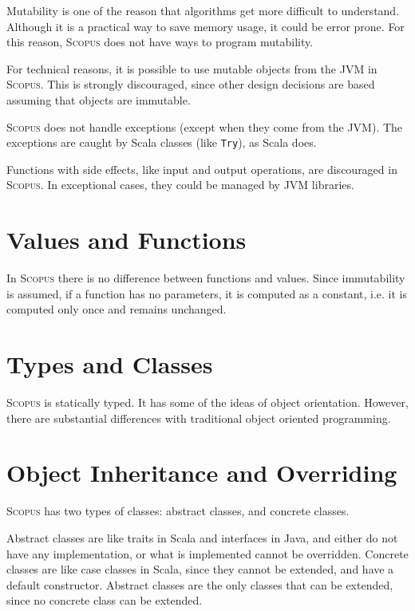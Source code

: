 \documentclass[12pt,a4paper]{book}
\newcommand{\srccode}[1]{\texttt{{#1}}}
\newcommand{\Scopus}{\textsc{Scopus}\xspace}
\begin{document}
    Mutability is one of the reason that algorithms get more difficult to understand.
    Although it is a practical way to save memory usage, it could be error prone.
    For this reason, \Scopus does not have ways to program mutability.

    For technical reasons, it is possible to use mutable objects from the JVM in \Scopus.
    This is strongly discouraged, since other design decisions are based assuming that objects are immutable.

    \Scopus does not handle exceptions (except when they come from the JVM).
    The exceptions are caught by Scala classes (like \srccode{Try}), as Scala does.

    Functions with side effects, like input and output operations, are discouraged in \Scopus.
    In exceptional cases, they could be managed by JVM libraries.


    \section{Values and Functions}

    In \Scopus there is no difference between functions and values.
    Since immutability is assumed, if a function has no parameters, it is computed as a constant, i.e. it is computed only once and remains unchanged.


    \section{Types and Classes}

    \Scopus is statically typed.
    It has some of the ideas of object orientation.
    However, there are substantial differences with traditional object oriented programming.


    \section{Object Inheritance and Overriding}

    \Scopus has two types of classes: abstract classes, and concrete classes.

    Abstract classes are like traits in Scala and interfaces in Java, and either do not have any implementation, or what is implemented cannot be overridden.
    Concrete classes are like case classes in Scala, since they cannot be extended, and have a default constructor.
    Abstract classes are the only classes that can be extended, since no concrete class can be extended.
\end{document}

